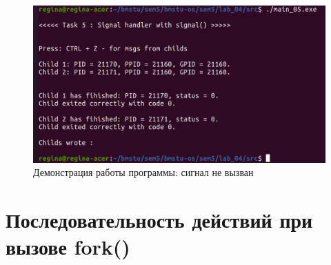 \begin{figure}[H]
	\begin{center}
		\includegraphics[scale=0.3]{inc/no.png}
	\end{center}
	\captionsetup{justification=centering}
	\caption{Демонстрация работы программы: сигнал не вызван}
	\label{img:no}
\end{figure}

\section*{Последовательность действий при вызове fork()}

